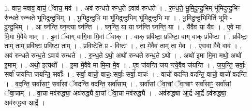 \documentclass[17pt]{extarticle}
\begin{document}
1. वाच॒ मवाव॒ वाचं॒ ॅवाच॒ मव॑ । . अव॑ रुन्धते रुन्ध॒ते ऽवाव॑ रुन्धते । . रु॒न्ध॒ते॒ भू॒मि॒दु॒न्दु॒भिम् भू॑मिदुन्दु॒भिꣳ रु॑न्धते रुन्धते भूमिदुन्दु॒भिम् । . भू॒मि॒दु॒न्दु॒भि मा भू॑मिदुन्दु॒भिम् भू॑मिदुन्दु॒भि मा । . भू॒मि॒दु॒न्दु॒भिमिति॑ भूमि - दु॒न्दु॒भिम् । . आ घ्न॑न्ति घ्न॒न्त्या घ्न॑न्ति । . घ्न॒न्ति॒ या या घ्न॑न्ति घ्नन्ति॒ या । . यैवैव या यैव । . ए॒वे मा मि॒मा मे॒वैवे माम् । . इ॒मां ॅवाग् वागि॒मा मि॒मां ॅवाक् । . वाक् प्रवि॑ष्टा॒ प्रवि॑ष्टा॒ वाग् वाक् प्रवि॑ष्टा । . प्रवि॑ष्टा॒ ताम् ताम् प्रवि॑ष्टा॒ प्रवि॑ष्टा॒ ताम् । . प्रवि॒ष्टेति॒ प्र - वि॒ष्टा॒ । . ता मे॒वैव ताम् ता मे॒व । . ए॒वावा वै॒वै वाव॑ । . अव॑ रुन्धते रुन्ध॒ते ऽवाव॑ रुन्धते । . रु॒न्ध॒ते ऽथो॒ अथो॑ रुन्धते रुन्ध॒ते ऽथो᳚ । . अथो॑ इ॒मा मि॒मा मथो॒ अथो॑ इ॒माम् । . अथो॒ इत्यथो᳚ । . इ॒मा मे॒वैवे मा मि॒मा मे॒व । . ए॒व ज॑यन्ति जय न्त्ये॒वैव ज॑यन्ति । . ज॒य॒न्ति॒ सर्वाः॒ सर्वा॑ जयन्ति जयन्ति॒ सर्वाः᳚ । . सर्वा॒ वाचो॒ वाचः॒ सर्वाः॒ सर्वा॒ वाचः॑ । . वाचो॑ वदन्ति वदन्ति॒ वाचो॒ वाचो॑ वदन्ति । . व॒द॒न्ति॒ सर्वा॑साꣳ॒॒ सर्वा॑सां ॅवदन्ति वदन्ति॒ सर्वा॑साम् । . सर्वा॑सां ॅवा॒चां ॅवा॒चाꣳ सर्वा॑साꣳ॒॒ सर्वा॑सां ॅवा॒चाम् । . वा॒चा मव॑रुद्ध्या॒ अव॑रुद्ध्यै वा॒चां ॅवा॒चा मव॑रुद्ध्यै । . अव॑रुद्ध्या आ॒र्द्र आ॒र्द्रे ऽव॑रुद्ध्या॒ अव॑रुद्ध्या आ॒र्द्रे । \newline
\end{document}

